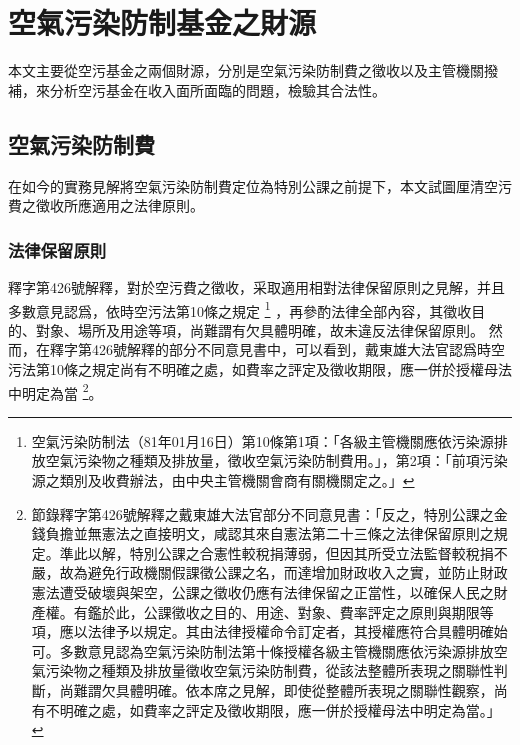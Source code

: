 \documentclass[12pt,a4paper]{article}
\begin{document}

\section{空氣污染防制基金之財源}

本文主要從空污基金之兩個財源，分別是空氣污染防制費之徵收以及主管機關撥補，來分析空污基金在收入面所面臨的問題，檢驗其合法性。

\subsection{空氣污染防制費}

在如今的實務見解將空氣污染防制費定位為特別公課之前提下，本文試圖厘清空污費之徵收所應適用之法律原則。

\subsubsection{法律保留原則}

釋字第426號解釋，對於空污費之徵收，采取適用相對法律保留原則之見解，并且多數意見認爲，依時空污法第10條之規定
\footnote{空氣污染防制法（81年01月16日）第10條第1項：「各級主管機關應依污染源排放空氣污染物之種類及排放量，徵收空氣污染防制費用。」，第2項：「前項污染源之類別及收費辦法，由中央主管機關會商有關機關定之。」}
，再參酌法律全部內容，其徵收目的、對象、場所及用途等項，尚難謂有欠具體明確，故未違反法律保留原則。
然而，在釋字第426號解釋的部分不同意見書中，可以看到，戴東雄大法官認爲時空污法第10條之規定尚有不明確之處，如費率之評定及徵收期限，應一併於授權母法中明定為當
\footnote{節錄釋字第426號解釋之戴東雄大法官部分不同意見書：「反之，特別公課之金錢負擔並無憲法之直接明文，咸認其來自憲法第二十三條之法律保留原則之規定。準此以解，特別公課之合憲性較稅捐薄弱，但因其所受立法監督較稅捐不嚴，故為避免行政機關假課徵公課之名，而達增加財政收入之實，並防止財政憲法遭受破壞與架空，公課之徵收仍應有法律保留之正當性，以確保人民之財產權。有鑑於此，公課徵收之目的、用途、對象、費率評定之原則與期限等項，應以法律予以規定。其由法律授權命令訂定者，其授權應符合具體明確始可。多數意見認為空氣污染防制法第十條授權各級主管機關應依污染源排放空氣污染物之種類及排放量徵收空氣污染防制費，從該法整體所表現之關聯性判斷，尚難謂欠具體明確。依本席之見解，即使從整體所表現之關聯性觀察，尚有不明確之處，如費率之評定及徵收期限，應一併於授權母法中明定為當。」}。


\end{document}
